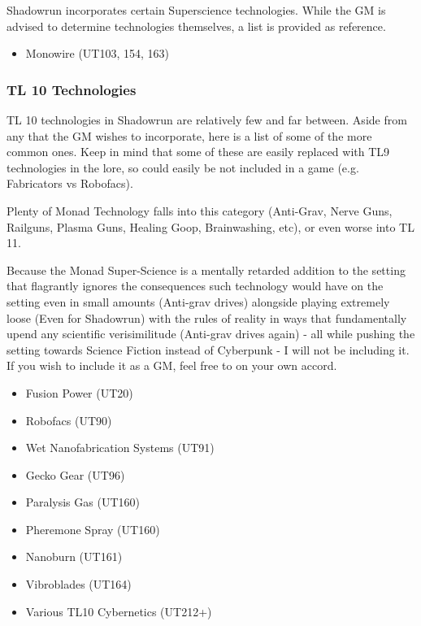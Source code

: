 \begin{multicols}{3}
	Shadowrun incorporates certain Superscience technologies. While the GM is advised to determine technologies themselves, a list is provided as reference.
	
	\begin{itemize}
		\item Monowire (UT103, 154, 163)
	\end{itemize}
	
	\subsubsection{TL 10 Technologies}
	
	TL 10 technologies in Shadowrun are relatively few and far between. Aside from any that the GM wishes to incorporate, here is a list of some of the more common ones. Keep in mind that some of these are easily replaced with TL9 technologies in the lore, so could easily be not included in a game (e.g. Fabricators vs Robofacs).
	
	Plenty of Monad Technology falls into this category (Anti-Grav, Nerve Guns, Railguns, Plasma Guns, Healing Goop, Brainwashing, etc), or even worse into TL 11.
	
	Because the Monad Super-Science is a mentally retarded addition to the setting that flagrantly ignores the consequences such technology would have on the setting even in small amounts (Anti-grav drives) alongside playing extremely loose (Even for Shadowrun) with the rules of reality in ways that fundamentally upend any scientific verisimilitude (Anti-grav drives again) - all while pushing the setting towards Science Fiction instead of Cyberpunk - I will not be including it. If you wish to include it as a GM, feel free to on your own accord.
	
	\begin{itemize}
		\itemsep 0pt
		\item Fusion Power (UT20)
		\item Robofacs (UT90)
		\item Wet Nanofabrication Systems (UT91)
		\item Gecko Gear (UT96)
		\item Paralysis Gas (UT160)
		\item Pheremone Spray (UT160)
		\item Nanoburn (UT161)
		\item Vibroblades (UT164)
		\item Various TL10 Cybernetics (UT212+)
	\end{itemize}
	

\end{multicols}
